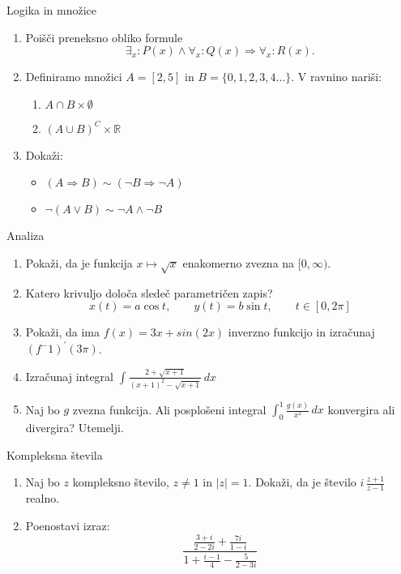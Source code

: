 \begin{frame}{Logika in množice}
	\begin{enumerate}
		\item
		Poišči preneksno obliko formule \[\exists_x : P(x) \wedge \forall_x : Q(x) \Rightarrow \forall_x : R(x).\] 
		\item 
		Definiramo množici $A = [2,5]$ in $B = \{0,1,2,3,4\dots \} $.
		V ravnino nariši:
		\begin{enumerate}
		   \item $A \cap B \times \emptyset $
		   \item $(A \cup B)^C \times \mathbb{R} $
		\end{enumerate}
		\item
		Dokaži:
		\begin{itemize}
			\item $(A \Rightarrow B) \sim (\lnot B \Rightarrow \lnot A)$
			\item $ \lnot(A \vee B) \sim \lnot A \wedge \lnot B $
		\end{itemize}
	\end{enumerate}
\end{frame}

\begin{frame}{Analiza}
	\begin{enumerate}
		\item
		Pokaži, da je funkcija $ x \mapsto \sqrt x $ enakomerno zvezna na $[0,\infty)$.
		\item 
		Katero krivuljo določa sledeč parametričen zapis?
		$$
		   x(t) = a \cos t, \qquad %
		   y(t) = b \sin t, \qquad %
		   t \in [0, 2 \pi]
		$$ 
		\item
		Pokaži, da ima $f(x) = 3x + sin(2x)$ inverzno funkcijo in izračunaj $(f^-1)^\prime (3\pi)$.
		
		\item
		Izračunaj integral 
		$
		\int \frac{2+\sqrt{x+1}}{(x+1)^2-\sqrt{x+1}} \,dx
		$ 
		\item 
		Naj bo $g$ zvezna funkcija. Ali posplošeni integral 
		$\int_{0}^{1} \frac{g(x)}{x^2} \,dx  $
		konvergira ali divergira? Utemelji.
	\end{enumerate}
\end{frame}

\begin{frame}{Kompleksna števila}
	\begin{enumerate}
		\item
		Naj bo $z$ kompleksno število, $z \ne 1$ in $\left\lvert z \right\rvert = 1$.
		Dokaži, da je število \( i \, \frac{z+1}{z-1} \) realno.
		\item
		Poenostavi izraz:
		\[ \frac{\frac{3 + i}{2 - 2i} + \frac{7i}{1 - i}}{1 + \frac{i - 1}{4} - \frac{5}{2-3i}} \]
	\end{enumerate}
\end{frame}